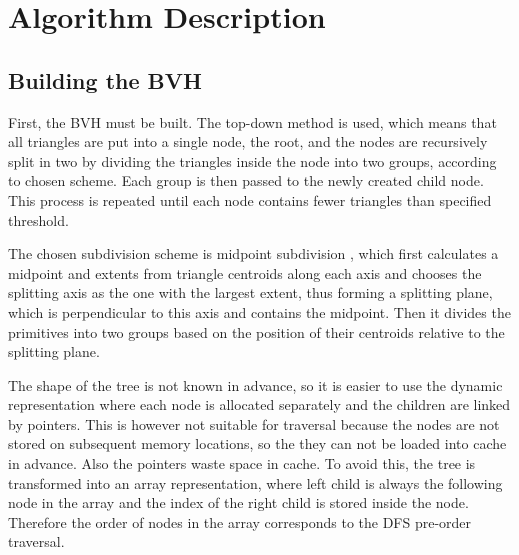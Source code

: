 \documentclass[report,11pt]{elsarticle}
\begin{document}
\section{\label{SEC:Description}Algorithm Description}
\subsection{Building the BVH}
First, the BVH must be built. The top-down method is used, which means that all triangles are put into a single node, the root, and the nodes are recursively split in two by dividing the triangles inside the node into two groups, according to chosen scheme. Each group is then passed to the newly created child node. This process is repeated until each node contains fewer triangles than specified threshold.

The chosen subdivision scheme is midpoint subdivision \cite{Pharr}, which first calculates a midpoint and extents from triangle centroids along each axis and chooses the splitting axis as the one with the largest extent, thus forming a splitting plane, which is perpendicular to this axis and contains the midpoint. Then it divides the primitives into two groups based on the position of their centroids relative to the splitting plane.

The shape of the tree is not known in advance, so it is easier to use the dynamic representation where each node is allocated separately and the children are linked by pointers. This is however not suitable for traversal because the nodes are not stored on subsequent memory locations, so the they can not be loaded into cache in advance. Also the pointers waste space in cache. To avoid this, the tree is transformed into an array representation, where left child is always the following node in the array and the index of the right child is stored inside the node. Therefore the order of nodes in the array corresponds to the DFS pre-order traversal.
\end{document}
